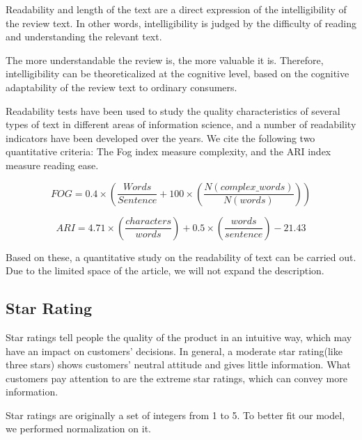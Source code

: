 \documentclass[12pt]{article}  %
\begin{document}
Readability and length of the text are a direct expression of the intelligibility of the review text. In other words, intelligibility is judged by the difficulty of reading and understanding the relevant text.

The more understandable the review is, the more valuable it is. Therefore, intelligibility can be theoreticalized at the cognitive level, based on the cognitive adaptability of the review text to ordinary consumers.

Readability tests have been used to study the quality characteristics of several types of text in different areas of information science, and a number of readability indicators have been developed over the years. We cite the following two quantitative criteria: The Fog index measure complexity, and the ARI index measure reading ease\cite{KorfiatisEvaluating}.  

\begin{equation}
	FOG = 0.4\times(\frac{Words}{Sentence}+100\times(\frac{N(complex\_words)}{N(words)}))
\end{equation}

\begin{equation}
ARI = 4.71 \times (\frac{characters}{words})+0.5\times(\frac{words}{sentence})-21.43
\end{equation}

Based on these, a quantitative study on the readability of text can be carried out. Due to the limited space of the article, we will not expand the description.

\subsection{Star Rating}
Star ratings tell people the quality of the product in an intuitive way, which may have an impact on customers' decisions. In general, a moderate star rating(like three stars) shows customers' neutral attitude and gives little information. What customers pay attention to are the extreme star ratings, which can convey more information.

Star ratings are originally a set of integers from 1 to 5. To better fit our model, we performed normalization on it. 
\end{document}
